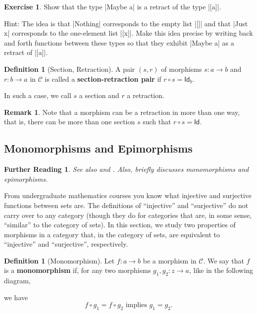 \documentclass[a4paper,10pt]{scrartcl}
\theoremstyle{plain}
\newtheorem*{reading*}{Further Reading}
\theoremstyle{definition}
\newtheorem{rem}[thm]{Remark}
\newtheorem{dfn}[thm]{Definition}
\newtheorem{exer}[thm]{Exercise}
\newcommand{\cfont}[1]{\ensuremath{\mathsf{#1}}}
\newcommand{\Cat}[1]{\mathcal{#1}}
\newcommand{\CC}{\Cat{C}}
\newcommand{\Id}[1][]{\cfont{Id}_{#1}}
\newcommand{\co}[2]{\ensuremath{#2 \circ #1}}
\begin{document}
\begin{exer}
 Show that the type |Maybe a| is a retract of the type |[a]|. 
 
 Hint: The idea is that |Nothing| corresponds to the empty list |[]| and that |Just x| corresponds to the one-element list |[x]|. Make this idea precise by writing back and forth functions between these types so that they exhibit |Maybe a| as a retract of |[a]|. 
\end{exer}

\begin{dfn}[Section, Retraction]
  A pair $(s,r)$ of morphisms $s : a \to b$ and $r : b \to a$ in $\CC$ is called a \textbf{section-retraction pair} if $\co{s}{r} = \Id[b]$.

  In such a case, we call $s$ a section and $r$ a retraction.
\end{dfn}

\begin{rem}
  Note that a morphism can be a retraction in more than one way, that is, there can be more than one section $s$ such that $\co{s}{r} = \Id$.
\end{rem}

\subsection{Monomorphisms and Epimorphisms}
\label{sec:mono-epi}

\begin{reading*}
See also \cite[p. 134]{leinster} and \cite[\S\S 2.8--2.9]{barr-wells}.
Also, \cite[\S 2.2]{pierce} briefly discusses monomorphisms and epimorphisms.
\end{reading*}

From undergraduate mathematics courses you know what injective and surjective functions between sets are.
The definitions of ``injective'' and ``surjective'' do not carry over to any category (though they do for categories that are, in some sense, ``similar'' to the category of sets).
In this section, we study two properties of morphisms in a category that, in the category of sets, are equivalent to ``injective'' and ``surjective'', respectively.



\begin{dfn}[Monomorphism]
  Let $f : a \to b$ be a morphism in $\CC$. We say that $f$ is a \textbf{monomorphism} if, for any two morphisms $g_1, g_2 : z \to a$, like in the following diagram,
  \begin{center}
  \end{center}
  we have
  \[ \co{g_1}{f} = \co{g_2}{f} \text{ implies } g_1 = g_2 .\]
\end{dfn}
\end{document}
